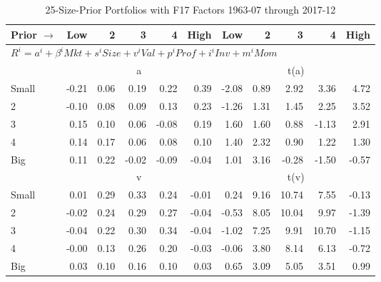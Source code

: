 
\begin{table}[!ht]
\footnotesize
\centering
\caption{25-Size-Prior Portfolios with F17 Factors 1963-07 through 2017-12}
\begin{tabular}{lrrrrrrrrrr}
  \toprule
    Prior $\rightarrow$ & Low & 2 & 3 & 4 & High & Low & 2 & 3 & 4 & High \\ 
  \midrule
  \multicolumn{11}{l}{$R^i=a^i+\beta^iMkt+s^iSize+v^iVal+p^iProf+i^iInv+m^iMom$} \\

  
    
      & \multicolumn{5}{c}{a} & \multicolumn{5}{c}{t(a)}
    
    \\
      \cmidrule(r){2-6} \cmidrule(r){7-11}

    Small   & -0.21  & 0.06  & 0.19  & 0.22  & 0.39  & -2.08  & 0.89  & 2.92  & 3.36  & 4.72  \\
         2  & -0.10  & 0.08  & 0.09  & 0.13  & 0.23  & -1.26  & 1.31  & 1.45  & 2.25  & 3.52  \\
         3  & 0.15  & 0.10  & 0.06  & -0.08  & 0.19  & 1.60  & 1.60  & 0.88  & -1.13  & 2.91  \\
         4  & 0.14  & 0.17  & 0.06  & 0.08  & 0.10  & 1.40  & 2.32  & 0.90  & 1.22  & 1.30  \\
    Big     & 0.11  & 0.22  & -0.02  & -0.09  & -0.04  & 1.01  & 3.16  & -0.28  & -1.50  & -0.57  \\

  
    
      & \multicolumn{5}{c}{v} & \multicolumn{5}{c}{t(v)}
    
    \\
      \cmidrule(r){2-6} \cmidrule(r){7-11}

    Small   & 0.01  & 0.29  & 0.33  & 0.24  & -0.01  & 0.24  & 9.16  & 10.74  & 7.55  & -0.13  \\
         2  & -0.02  & 0.24  & 0.29  & 0.27  & -0.04  & -0.53  & 8.05  & 10.04  & 9.97  & -1.39  \\
         3  & -0.04  & 0.22  & 0.30  & 0.34  & -0.04  & -1.02  & 7.25  & 9.91  & 10.70  & -1.15  \\
         4  & -0.00  & 0.13  & 0.26  & 0.20  & -0.03  & -0.06  & 3.80  & 8.14  & 6.13  & -0.72  \\
    Big     & 0.03  & 0.10  & 0.16  & 0.10  & 0.03  & 0.65  & 3.09  & 5.05  & 3.51  & 0.99  \\

  
    

\end{tabular}
\end{table}
